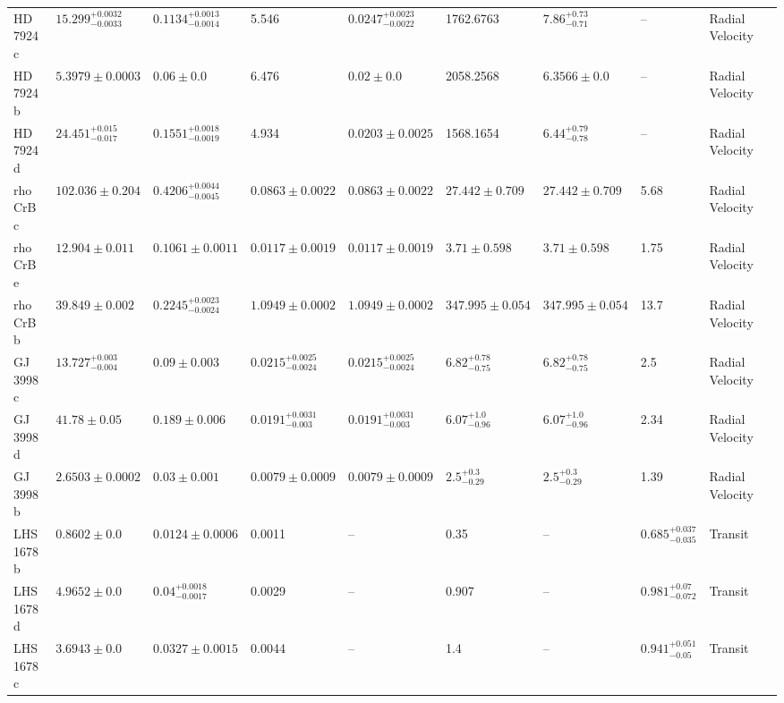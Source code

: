 \begin{tabular}{llllllllll}
HD 7924 c & $15.299^{+0.0032}_{-0.0033}$ & $0.1134^{+0.0013}_{-0.0014}$ & 5.546 & $0.0247^{+0.0023}_{-0.0022}$ & 1762.6763 & $7.86^{+0.73}_{-0.71}$ & -- & Radial Velocity & \cite{FULTON_ET_AL__2015} \\
HD 7924 b & $5.3979 \pm 0.0003$ & $0.06 \pm 0.0$ & 6.476 & $0.02 \pm 0.0$ & 2058.2568 & $6.3566 \pm 0.0$ & -- & Radial Velocity & \cite{STASSUN_ET_AL__2017} \\
HD 7924 d & $24.451^{+0.015}_{-0.017}$ & $0.1551^{+0.0018}_{-0.0019}$ & 4.934 & $0.0203 \pm 0.0025$ & 1568.1654 & $6.44^{+0.79}_{-0.78}$ & -- & Radial Velocity & \cite{FULTON_ET_AL__2015} \\
rho CrB c & $102.036 \pm 0.204$ & $0.4206^{+0.0044}_{-0.0045}$ & $0.0863 \pm 0.0022$ & $0.0863 \pm 0.0022$ & $27.442 \pm 0.709$ & $27.442 \pm 0.709$ & 5.68 & Radial Velocity & \cite{ZHAO_ET_AL_2026} \\
rho CrB e & $12.904 \pm 0.011$ & $0.1061 \pm 0.0011$ & $0.0117 \pm 0.0019$ & $0.0117 \pm 0.0019$ & $3.71 \pm 0.598$ & $3.71 \pm 0.598$ & 1.75 & Radial Velocity & \cite{ZHAO_ET_AL_2026} \\
rho CrB b & $39.849 \pm 0.002$ & $0.2245^{+0.0023}_{-0.0024}$ & $1.0949 \pm 0.0002$ & $1.0949 \pm 0.0002$ & $347.995 \pm 0.054$ & $347.995 \pm 0.054$ & 13.7 & Radial Velocity & \cite{ZHAO_ET_AL_2026} \\
GJ 3998 c & $13.727^{+0.003}_{-0.004}$ & $0.09 \pm 0.003$ & $0.0215^{+0.0025}_{-0.0024}$ & $0.0215^{+0.0025}_{-0.0024}$ & $6.82^{+0.78}_{-0.75}$ & $6.82^{+0.78}_{-0.75}$ & 2.5 & Radial Velocity & \cite{STEFANOV_ET_AL__2025} \\
GJ 3998 d & $41.78 \pm 0.05$ & $0.189 \pm 0.006$ & $0.0191^{+0.0031}_{-0.003}$ & $0.0191^{+0.0031}_{-0.003}$ & $6.07^{+1.0}_{-0.96}$ & $6.07^{+1.0}_{-0.96}$ & 2.34 & Radial Velocity & \cite{STEFANOV_ET_AL__2025} \\
GJ 3998 b & $2.6503 \pm 0.0002$ & $0.03 \pm 0.001$ & $0.0079 \pm 0.0009$ & $0.0079 \pm 0.0009$ & $2.5^{+0.3}_{-0.29}$ & $2.5^{+0.3}_{-0.29}$ & 1.39 & Radial Velocity & \cite{STEFANOV_ET_AL__2025} \\
LHS 1678 b & $0.8602 \pm 0.0$ & $0.0124 \pm 0.0006$ & 0.0011 & -- & 0.35 & -- & $0.685^{+0.037}_{-0.035}$ & Transit & \cite{SILVERSTEIN_ET_AL_2024} \\
LHS 1678 d & $4.9652 \pm 0.0$ & $0.04^{+0.0018}_{-0.0017}$ & 0.0029 & -- & 0.907 & -- & $0.981^{+0.07}_{-0.072}$ & Transit & \cite{SILVERSTEIN_ET_AL_2024} \\
LHS 1678 c & $3.6943 \pm 0.0$ & $0.0327 \pm 0.0015$ & 0.0044 & -- & 1.4 & -- & $0.941^{+0.051}_{-0.05}$ & Transit & \cite{SILVERSTEIN_ET_AL_2024} \\

\end{tabular}
